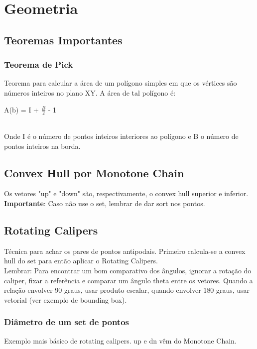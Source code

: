 \section{Geometria}

\subsection{Teoremas Importantes}

\subsubsection{Teorema de Pick}
Teorema para calcular a \'{a}rea de um pol\'{i}gono simples em que os v\'{e}rtices são n\'{u}meros inteiros no plano XY. A \'{a}rea de tal pol\'{i}gono é: 
\\\centerline{A(b) = I + $\frac{B}{2}$ - 1}
\\Onde I \'{e} o n\'{u}mero de pontos inteiros interiores ao pol\'{i}gono e B o n\'{u}mero de pontos inteiros na borda.

\divisor

\subsection{Convex Hull por Monotone Chain}
Os vetores "up" e "down" s\~{a}o, respectivamente, o convex hull superior e inferior.
\\ \textbf{Importante}: Caso n\~{a}o use o set, lembrar de dar sort nos pontos.

\divisor

\subsection{Rotating Calipers}

T\'{e}cnica para achar os pares de pontos antipodais. Primeiro calcula-se a convex hull do set para ent\~{a}o aplicar o Rotating Calipers.
\\ Lembrar: Para encontrar um bom comparativo dos \^{a}ngulos, ignorar a rota\c{c}\~{a}o do caliper, fixar a refer\^{e}ncia e comparar um \^{a}ngulo theta entre os vetores. Quando a rela\c{c}\~{a}o envolver 90 graus, usar produto escalar, quando envolver 180 graus, usar vetorial (ver exemplo de bounding box).

\subsubsection{Di\^{a}metro de um set de pontos}
Exemplo mais b\'{a}sico de rotating calipers. up e dn v\^{e}m do Monotone Chain.
\divisor

